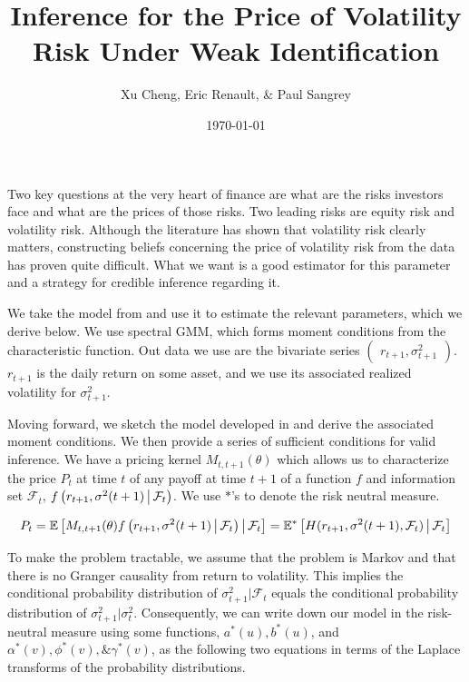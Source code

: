 \documentclass[11pt]{article}
\author{Xu Cheng, Eric Renault, \& Paul Sangrey}
\title{Inference for the Price of Volatility Risk Under Weak Identification}
\date{\today}
\newcommand*{\F}{\mathcal{F}}
\newcommand*{\E}{\mathbb{E}}
\newcommand{\mvert}[1][\middle]{\ensuremath{\,#1\vert\,}}
\begin{document}
\maketitle

Two key questions at the very heart of finance are what are the risks investors face and what are the prices of
those risks.
Two leading risks are equity risk and volatility risk.
Although the literature has shown that volatility risk clearly matters, constructing beliefs concerning the price
of volatility risk from the data has proven quite difficult.
What we want is a good estimator for this parameter and a strategy for credible inference regarding it.  

We take the model from \textcite{khrapov2016affine} and use it to estimate the relevant
parameters, which we derive below. 
We use spectral GMM, which forms moment conditions from the characteristic function.
Out data we use are the bivariate series $\begin{pmatrix} r_{t+1}, \sigma^2_{t+1} \end{pmatrix}$.
$r_{t+1}$ is the daily return on some asset, and we use its associated realized volatility for $\sigma^2_{t+1}$.

Moving forward, we sketch the model developed in \textcite{khrapov2016affine} and derive the associated moment
conditions.
We then provide a series of sufficient conditions for valid inference. 
We have a pricing kernel $M_{t, t+1}(\theta)$ which allows us to characterize the price $P_t$ at time $t$ of any
payoff at time $t+1$ of a function $f$ and information set $\F_t$, $f\left(r_{t+1}, \sigma^2(t+1) \mvert
\F_t\right)$. 
We use $*$'s to denote the risk neutral measure.

\begin{equation}
    P_t  = \E\left[M_{t,t+1}(\theta) f\left(r_{t+1}, \sigma^2(t+1) \mvert  \F_t\right) \mvert \F_t \right] =
    \E^{*}\left[H(r_{t+1}, \sigma^2(t+1),  \F_t) \mvert \F_t \right] 
\end{equation}


To make the problem tractable, we assume that the problem is Markov and that there is no Granger causality from
return to volatility. 
This implies the conditional probability distribution of $\sigma^2_{t+1} \vert \F_t$ equals the conditional
probability distribution of $\sigma^2_{t+1} \vert \sigma^2_t$.
Consequently, we can write down our model in the risk-neutral measure using some functions, $a^{*}(u), b^{*}(u)$,
and $\alpha^{*}(v), \phi^{*}(v), \& \gamma^{*}(v)$, as the following two equations in terms of the Laplace
transforms of the probability distributions.
\end{document}
